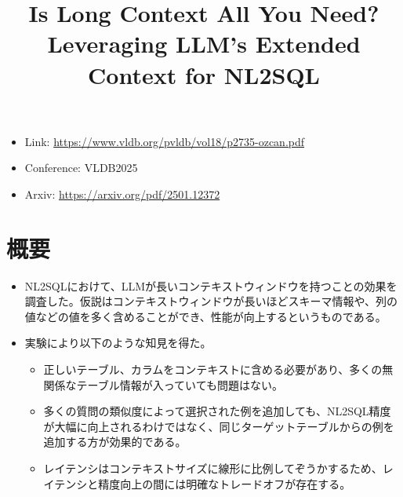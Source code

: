 \documentclass[dvipdfmx,uplatex]{jsarticle}
\title{Is Long Context All You Need? Leveraging LLM’s Extended
Context for NL2SQL}
\author{\empty}
\date{\empty}
\theoremstyle{remark}
\newenvironment{simplebox}{
    \begin{tcolorbox}[
        fonttitle=\bfseries,
    ]
}{
    \end{tcolorbox}
}
\begin{document}
\maketitle

\begin{itemize}
    \item Link: \url{https://www.vldb.org/pvldb/vol18/p2735-ozcan.pdf}
    \item Conference: VLDB2025
    \item Arxiv: \url{https://arxiv.org/pdf/2501.12372}
\end{itemize}

\section{概要}
\begin{simplebox}
\begin{itemize}
    \item NL2SQLにおけて、LLMが長いコンテキストウィンドウを持つことの効果を調査した。仮説はコンテキストウィンドウが長いほどスキーマ情報や、列の値などの値を多く含めることができ、性能が向上するというものである。
    \item 実験により以下のような知見を得た。
    \begin{itemize}
        \item 正しいテーブル、カラムをコンテキストに含める必要があり、多くの無関係なテーブル情報が入っていても問題はない。
        \item 多くの質問の類似度によって選択された例を追加しても、NL2SQL精度が大幅に向上されるわけではなく、同じターゲットテーブルからの例を追加する方が効果的である。
        \item レイテンシはコンテキストサイズに線形に比例してぞうかするため、レイテンシと精度向上の間には明確なトレードオフが存在する。
    \end{itemize}
\end{itemize}
\end{simplebox}
\end{document}
